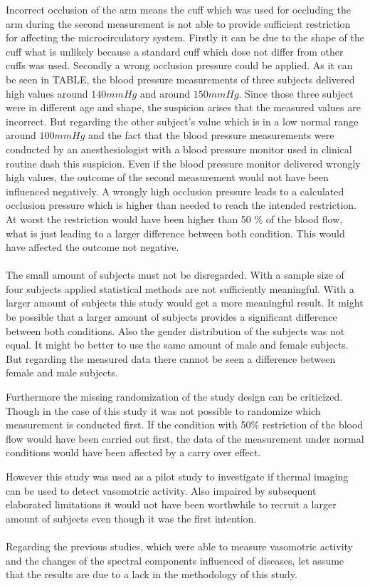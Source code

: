 Incorrect occlusion of the arm means the cuff which was used for occluding the arm during the second measurement is not able to provide sufficient restriction for affecting the microcirculatory system. Firstly it can be due to the shape of the cuff what is unlikely because a standard cuff which dose not differ from other cuffs was used. Secondly a wrong occlusion pressure could be applied. As it can be seen in TABLE, the blood pressure measurements of three subjects delivered high values around $140 mmHg$ and around $150 mmHg$. Since those three subject were in different age and shape, the suspicion arises that the measured values are incorrect. But regarding the other subject's value which is in a low normal range around $100 mmHg$ and the fact that the blood pressure measurements were conducted by an anesthesiologist with a blood pressure monitor used in clinical routine dash this suspicion.
Even if the blood pressure monitor delivered wrongly high values, the outcome of the second measurement would not have been influenced negatively. A wrongly high occlusion pressure leads to a calculated occlusion pressure which is higher than needed to reach the intended restriction. At worst the restriction would have been higher than 50 \% of the blood flow, what is just leading to a larger difference between both condition. This would have affected the outcome not negative. %
\\
\\
The small amount of subjects must not be disregarded. With a sample size of four subjects applied statistical methods are not sufficiently meaningful. With a larger amount of subjects this study would get a more meaningful result. It might be possible that a larger amount of subjects provides a significant difference between both conditions.
Also the gender distribution of the subjects was not equal. It might be better to use the same amount of male and female subjects. But regarding the measured data there cannot be seen a difference between female and male subjects.

Furthermore the missing randomization of the study design can be criticized. Though in the case of this study it was not possible to randomize which measurement is conducted first. If the condition with 50\% restriction of the blood flow would have been carried out first, the data of the measurement under normal conditions would have been affected by a carry over effect.

However this study was used as a pilot study to investigate if thermal imaging can be used to detect vasomotric activity. Also impaired by subsequent elaborated limitations it would not have been worthwhile to recruit a larger amount of subjects even though it was the first intention.
\\
\\
Regarding the previous studies, which were able to measure vasomotric activity and the changes of the spectral components influenced of diseases, let assume that the results are due to a lack in the methodology of this study.

